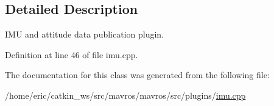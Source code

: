 \subsection{Detailed Description}
I\+MU and attitude data publication plugin. 

Definition at line 46 of file imu.\+cpp.



The documentation for this class was generated from the following file\+:\begin{DoxyCompactItemize}
\item 
/home/eric/catkin\+\_\+ws/src/mavros/mavros/src/plugins/\mbox{\hyperlink{imu_8cpp}{imu.\+cpp}}\end{DoxyCompactItemize}
